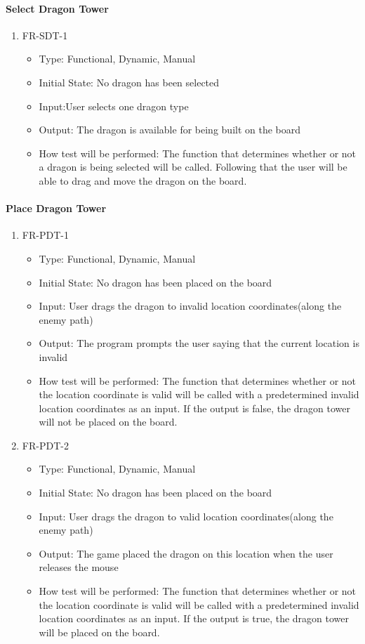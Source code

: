 \documentclass[12,english]{article}
\begin{document}
\paragraph{Select Dragon Tower}
\begin{enumerate}
  \item FR-SDT-1
  \begin{itemize}
      \item Type: Functional, Dynamic, Manual
      \item Initial State: No dragon has been selected
      \item Input:User selects one dragon type
      \item Output: The dragon is available for being built on the board
      \item How test will be performed: The function that determines whether or not a dragon is being selected will be called. Following that the user will be able to drag and move the dragon on the board. 
  \end{itemize}
\end{enumerate}

\paragraph{Place Dragon Tower}
\begin{enumerate}
  \item FR-PDT-1
  \begin{itemize}
      \item Type: Functional, Dynamic, Manual
      \item Initial State: No dragon has been placed on the board
      \item Input: User drags the dragon to invalid location coordinates(along the enemy path)
      \item Output: The program prompts the user saying that the current location is invalid
      \item How test will be performed: The function that determines whether or not the location coordinate is valid will be called with a predetermined invalid location coordinates as an input. If the output is false, the dragon tower will not be placed on the board. 
  \end{itemize}
  \item FR-PDT-2
  \begin{itemize}
      \item Type: Functional, Dynamic, Manual
      \item Initial State: No dragon has been placed on the board
      \item Input: User drags the dragon to valid location coordinates(along the enemy path)
      \item Output: The game placed the dragon on this location when the user releases the mouse
      \item How test will be performed: The function that determines whether or not the location coordinate is valid will be called with a predetermined invalid location coordinates as an input. If the output is true, the dragon tower will be placed on the board.
  \end{itemize}
\end{enumerate}
\end{document}
